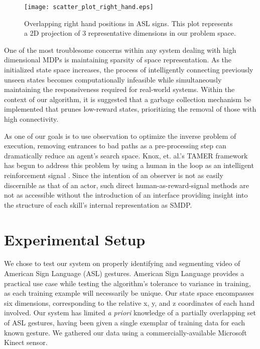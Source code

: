 \documentclass[letterpaper]{article}
\begin{document}
\begin{figure}[tb]
\begin{center}
\texttt{[image: scatter\_plot\_right\_hand.eps]}
\caption{Overlapping right hand positions in ASL signs. This plot represents a 2D projection of 3 representative dimensions in our problem space.}
\label{fig:asl_sign_overlap}
\end{center}
\end{figure}

One of the most troublesome concerns within any system dealing with high dimensional MDPs is maintaining sparsity of space representation. As the initialized state space increases, the process of intelligently connecting previously unseen states becomes computationally infeasible while simultaneously maintaining the responsiveness required for real-world systems. Within the context of our algorithm, it is suggested that a garbage collection mechanism be implemented that prunes low-reward states, prioritizing the removal of those with high connectivity. 

As one of our goals is to use observation to optimize the inverse problem of execution, removing entrances to bad paths as a pre-processing step can dramatically reduce an agent's search space. Knox, et. al.'s TAMER framework has begun to address this problem by using a human in the loop as an intelligent reinforcement signal \cite{TAMER}. Since the intention of an observer is not as easily discernible as that of an actor, such direct human-as-reward-signal methods are not as accessible without the introduction of an interface providing insight into the structure of each skill's internal representation as SMDP.

\section{Experimental Setup}
\label{sec:experiment}
We chose to test our system on properly identifying and segmenting video of American Sign Language (ASL) gestures. American Sign Language provides a practical use case while testing the algorithm's tolerance to variance in training, as each training example will necessarily be unique. Our state space encompasses six dimensions, corresponding to the relative x, y, and z coordinates of each hand involved.  Our system has limited \textit{a priori} knowledge of a partially overlapping set of ASL gestures, having been given a single exemplar of training data for each known gesture. We gathered our data using a commercially-available Microsoft Kinect sensor. 
\end{document}
